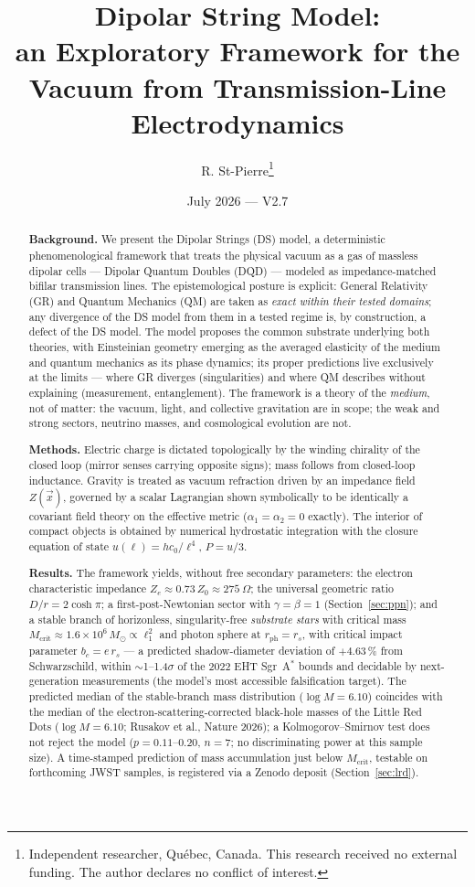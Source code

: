 \documentclass[11pt,a4paper]{article}
\title{\textbf{Dipolar String Model:}\\ \large an Exploratory Framework for the Vacuum from Transmission-Line Electrodynamics}
\author{R. St-Pierre\thanks{Independent researcher, Qu\'ebec, Canada. This research received no external funding. The author declares no conflict of interest.}}
\date{July 2026 --- V2.7}
\theoremstyle{plain}
\theoremstyle{remark}
\begin{document}
\maketitle

\begin{abstract}
\noindent\textbf{Background.} We present the Dipolar Strings (DS) model, a deterministic phenomenological framework that treats the physical vacuum as a gas of massless dipolar cells --- Dipolar Quantum Doubles (DQD) --- modeled as impedance-matched bifilar transmission lines. The epistemological posture is explicit: General Relativity (GR) and Quantum Mechanics (QM) are taken as \emph{exact within their tested domains}; any divergence of the DS model from them in a tested regime is, by construction, a defect of the DS model. The model proposes the common substrate underlying both theories, with Einsteinian geometry emerging as the averaged elasticity of the medium and quantum mechanics as its phase dynamics; its proper predictions live exclusively at the limits --- where GR diverges (singularities) and where QM describes without explaining (measurement, entanglement). The framework is a theory of the \emph{medium}, not of matter: the vacuum, light, and collective gravitation are in scope; the weak and strong sectors, neutrino masses, and cosmological evolution are not.

\noindent\textbf{Methods.} Electric charge is dictated topologically by the winding chirality of the closed loop (mirror senses carrying opposite signs); mass follows from closed-loop inductance. Gravity is treated as vacuum refraction driven by an impedance field $Z(\vec{x})$, governed by a scalar Lagrangian shown symbolically to be identically a covariant field theory on the effective metric ($\alpha_1 = \alpha_2 = 0$ exactly). The interior of compact objects is obtained by numerical hydrostatic integration with the closure equation of state $u(\ell) = hc_0/\ell^4$, $P = u/3$.

\noindent\textbf{Results.} The framework yields, without free secondary parameters: the electron characteristic impedance $Z_e \approx 0.73\,Z_0 \approx 275~\Omega$; the universal geometric ratio $D/r = 2\cosh\pi$; a first-post-Newtonian sector with $\gamma = \beta = 1$ (Section~\ref{sec:ppn}); and a stable branch of horizonless, singularity-free \emph{substrate stars} with critical mass $M_{\text{crit}} \approx 1.6\times10^{6}\,M_\odot \propto \ell_1^2$ and photon sphere at $r_{\text{ph}} = r_s$, with critical impact parameter $b_c = e\,r_s$ --- a predicted shadow-diameter deviation of $+4.63\,\%$ from Schwarzschild, within $\sim$1--1.4$\sigma$ of the 2022 EHT Sgr~A$^*$ bounds and decidable by next-generation measurements (the model's most accessible falsification target). The predicted median of the stable-branch mass distribution ($\log M = 6.10$) coincides with the median of the electron-scattering-corrected black-hole masses of the Little Red Dots ($\log M = 6.10$; Rusakov et al., Nature 2026); a Kolmogorov--Smirnov test does not reject the model ($p = 0.11$--$0.20$, $n = 7$; no discriminating power at this sample size). A time-stamped prediction of mass accumulation just below $M_{\text{crit}}$, testable on forthcoming JWST samples, is registered via a Zenodo deposit (Section~\ref{sec:lrd}).


\end{abstract}
\end{document}
